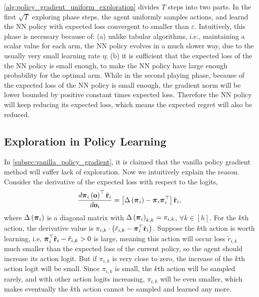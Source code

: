 \cref{alg:policy_gradient_uniform_exploration} divides $T$ steps into two parts. In the first $\sqrt{T}$ exploring phase steps, the agent uniformly samples actions, and learnd the NN policy with expected loss convergent to smaller than $\varepsilon$. Intuitively, this phase is necessary because of: (a) unlike tabular algorithms, i.e., maintaining a scalar value for each arm, the NN policy evolves in a much slower way, due to the usually very small learning rate $\eta$; (b) it is sufficient that the expected loss of the the NN policy is small enough, to make the NN policy have large enough probability for the optimal arm. While in the second playing phase, because of the expected loss of the NN policy is small enough, the gradient norm will be lower bounded by positive constant times expected loss. Therefore the NN policy will keep reducing its expected loss, which means the expected regret will also be reduced.

\subsection{Exploration in Policy Learning}
\label{subsec:exploration_in_policy_learning}

In \cref{subsec:vanilla_policy_gradient}, it is claimed that the vanilla policy gradient method will suffer lack of exploration. Now we intuitively explain the reason. Consider the derivative of the expected loss with respect to the logits,
\begin{equation}
\label{eq:logit_derivative}
\begin{split}
    \frac{d {\boldsymbol{\pi}}_i\left( {\mathbf{o}} \right)^\top {\tilde{\mathbf{r}}}_i}{d {\mathbf{o}}_i} = \left[ \Delta\left( {\boldsymbol{\pi}}_i \right) - {\boldsymbol{\pi}}_i {\boldsymbol{\pi}}_i^\top \right] {\tilde{\mathbf{r}}}_i,
\end{split}
\end{equation}
where $\Delta\left( {\boldsymbol{\pi}}_i \right)$ is a diagonal matrix with $\Delta\left( {\boldsymbol{\pi}}_i \right)_{k,k} = \pi_{i,k}$, $\forall k \in [h]$. For the $k$th action, the derivative value is $\pi_{i,k} \cdot \left( \tilde{r}_{i,k} - {\boldsymbol{\pi}}_i^\top {\tilde{\mathbf{r}}}_i \right)$. Suppose the $k$th action is worth learning, i.e, ${\boldsymbol{\pi}}_i^\top {\tilde{\mathbf{r}}}_i - \tilde{r}_{i,k} > 0$ is large, meaning this action will occur loss $\tilde{r}_{i,k}$ much smaller than the expected loss of the current policy, so the agent should increase its action logit. But if $\pi_{i,k}$ is very close to zero, the increase of the $k$th action logit will be small. Since $\pi_{i,k}$ is small, the $k$th action will be sampled rarely, and with other action logits increasing, $\pi_{i,k}$ will be even smaller, which makes eventually the $k$th action cannot be sampled and learned any more.

